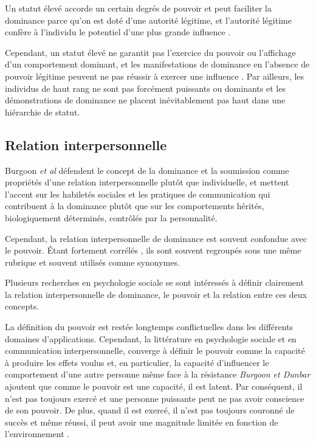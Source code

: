 	Un statut élevé accorde un certain degrés de pouvoir et peut faciliter la dominance parce qu'on est doté d'une autorité légitime, et l'autorité légitime confère à l'individu le potentiel d'une plus grande influence \cite{burgoon2006nonverbal}. 
	
	Cependant, un statut élevé ne garantit pas l'exercice du pouvoir ou l'affichage d'un comportement dominant, et les manifestations de dominance en l'absence de pouvoir légitime peuvent ne pas réussir à exercer une influence \cite{ridgeway1995legitimacy}.
	Par ailleurs, les individus de haut rang ne sont pas forcément puissants ou dominants et les démonstrations de dominance ne placent inévitablement pas haut dans une hiérarchie de statut\cite{burgoonnonverbal}.
	
	\subsection{Relation interpersonnelle}
		Burgoon \emph{et al} \cite{burgoon1998nature} défendent le concept de la dominance et la soumission comme propriétés d'une relation interpersonnelle plutôt que individuelle, et mettent l'accent sur les habiletés sociales et les pratiques de communication qui contribuent à la dominance plutôt que sur les comportements hérités, biologiquement déterminés, contrôlés par la personnalité.
		
		Cependant, la relation interpersonnelle de dominance est souvent confondue avec le pouvoir. Étant fortement corrélés \cite{dunbar2005perceptions}, ils sont souvent regroupés sous une même rubrique \cite{ellyson1985power} et souvent utilisés comme synonymes.
		
		Plusieurs recherches en psychologie sociale \cite{burgoon1998nature,dunbar2005perceptions} se sont intéressés à définir clairement la relation interpersonnelle de dominance, le pouvoir et la relation entre ces deux concepts. 
		
		
		La définition du pouvoir est  restée longtemps conflictuelles dans les différents domaines d'applications. Cependant, la littérature en psychologie sociale et en communication interpersonnelle, converge à définir le pouvoir comme la capacité à produire les effets voulus et, en particulier, la capacité d'influencer le comportement d'une autre personne même face à la résistance  \cite{burgoon2000interactionist,burgoon2006nonverbal,huston1983power}
		\emph{Burgoon et Dunbar} \cite{burgoon1998nature,dunbar2005perceptions} ajoutent que comme le pouvoir est une capacité, il est latent. Par conséquent, il n'est pas toujours exercé et une personne puissante peut ne pas avoir conscience de son pouvoir. De plus, quand il est exercé, il n'est pas toujours couronné de succès et même réussi, il peut avoir une magnitude limitée en fonction de l'environnement \cite{huston1983power}.
		
